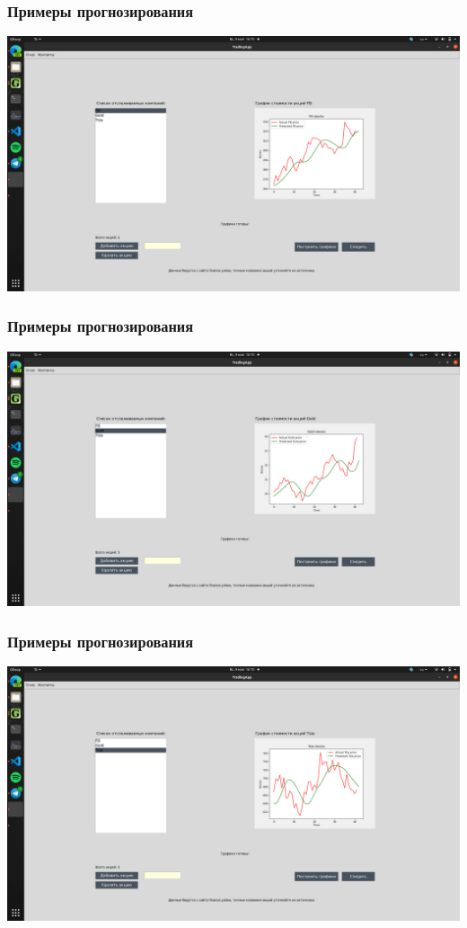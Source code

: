 \documentclass{beamer}
\begin{document}
\begin{frame}
 \frametitle{Примеры прогнозирования}
 \includegraphics[scale = 0.176]{exmpl1.png}
\end{frame}
\begin{frame}
 \frametitle{Примеры прогнозирования}
 \includegraphics[scale = 0.176]{exmpl2.png}
\end{frame}
\begin{frame}
 \frametitle{Примеры прогнозирования}
 \includegraphics[scale = 0.176]{exmpl3.png}
\end{frame}
\end{document}
